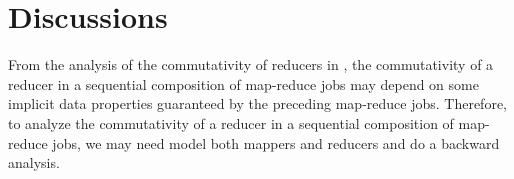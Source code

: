 	
\section{Discussions}
\label{sec:conclusion}

From the analysis of the commutativity of reducers in \cite{XZZ+14}, the commutativity of a reducer in a sequential composition of map-reduce jobs may depend on some implicit data properties guaranteed by the preceding map-reduce jobs. Therefore, to analyze the commutativity of a reducer in a sequential composition of map-reduce jobs, we may need model both mappers and reducers and do a backward analysis.


